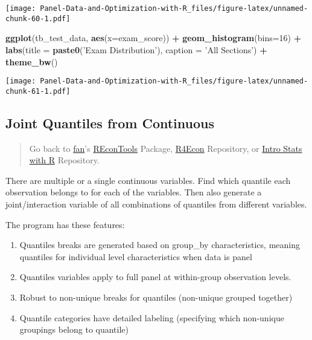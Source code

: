 \documentclass[
]{book}
\newenvironment{Shaded}{\begin{snugshade}}{\end{snugshade}}
\newcommand{\DataTypeTok}[1]{\textcolor[rgb]{0.13,0.29,0.53}{#1}}
\newcommand{\DecValTok}[1]{\textcolor[rgb]{0.00,0.00,0.81}{#1}}
\newcommand{\KeywordTok}[1]{\textcolor[rgb]{0.13,0.29,0.53}{\textbf{#1}}}
\newcommand{\NormalTok}[1]{#1}
\newcommand{\OperatorTok}[1]{\textcolor[rgb]{0.81,0.36,0.00}{\textbf{#1}}}
\newcommand{\StringTok}[1]{\textcolor[rgb]{0.31,0.60,0.02}{#1}}
\providecommand{\tightlist}{%
  \setlength{\itemsep}{0pt}\setlength{\parskip}{0pt}}
\begin{document}
\texttt{[image: Panel-Data-and-Optimization-with-R\_files/figure-latex/unnamed-chunk-60-1.pdf]}

\begin{Shaded}
\begin{Highlighting}[]
\KeywordTok{ggplot}\NormalTok{(tb_test_data, }\KeywordTok{aes}\NormalTok{(}\DataTypeTok{x=}\NormalTok{exam_score)) }\OperatorTok{+}
\StringTok{  }\KeywordTok{geom_histogram}\NormalTok{(}\DataTypeTok{bins=}\DecValTok{16}\NormalTok{) }\OperatorTok{+}
\StringTok{  }\KeywordTok{labs}\NormalTok{(}\DataTypeTok{title =} \KeywordTok{paste0}\NormalTok{(}\StringTok{'Exam Distribution'}\NormalTok{),}
       \DataTypeTok{caption =} \StringTok{'All Sections'}\NormalTok{) }\OperatorTok{+}
\StringTok{  }\KeywordTok{theme_bw}\NormalTok{()}
\end{Highlighting}
\end{Shaded}

\texttt{[image: Panel-Data-and-Optimization-with-R\_files/figure-latex/unnamed-chunk-61-1.pdf]}

\hypertarget{joint-quantiles-from-continuous}{%
\subsection{Joint Quantiles from Continuous}\label{joint-quantiles-from-continuous}}

\begin{quote}
Go back to \href{http://fanwangecon.github.io/CodeDynaAsset/}{fan}'s \href{https://fanwangecon.github.io/REconTools/}{REconTools} Package, \href{https://fanwangecon.github.io/R4Econ/}{R4Econ} Repository, or \href{https://fanwangecon.github.io/Stat4Econ/}{Intro Stats with R} Repository.
\end{quote}

There are multiple or a single continuous variables. Find which quantile each observation belongs to for each of the variables. Then also generate a joint/interaction variable of all combinations of quantiles from different variables.

The program has these features:

\begin{enumerate}
\def\labelenumi{\arabic{enumi}.}
\tightlist
\item
  Quantiles breaks are generated based on group\_by characteristics, meaning quantiles for individual level characteristics when data is panel
\item
  Quantiles variables apply to full panel at within-group observation levels.
\item
  Robust to non-unique breaks for quantiles (non-unique grouped together)
\item
  Quantile categories have detailed labeling (specifying which non-unique groupings belong to quantile)
\end{enumerate}
\end{document}
